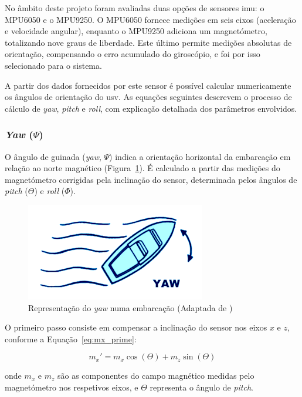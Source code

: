 No âmbito deste projeto foram avaliadas duas opções de sensores \gls{imu}: o MPU6050 e o MPU9250. O MPU6050 fornece medições em seis eixos (aceleração e velocidade angular), enquanto o MPU9250 adiciona um magnetómetro, totalizando nove graus de liberdade. Este último permite medições absolutas de orientação, compensando o erro acumulado do giroscópio, e foi por isso selecionado para o sistema.

A partir dos dados fornecidos por este sensor é possível calcular numericamente os ângulos de orientação do \gls{usv}. As equações seguintes descrevem o processo de cálculo de \emph{yaw}, \emph{pitch} e \emph{roll}, com explicação detalhada dos parâmetros envolvidos.

\subsubsection{\emph{Yaw} (\(\Psi\))}

O ângulo de guinada (\emph{yaw}, \(\Psi\)) indica a orientação horizontal da embarcação em relação ao norte magnético (Figura~\ref{fig:yaw}). É calculado a partir das medições do magnetómetro corrigidas pela inclinação do sensor, determinada pelos ângulos de \emph{pitch} (\(\Theta\)) e \emph{roll} (\(\Phi\)).

\begin{figure}[H]
    \centering
    \includegraphics[height=0.2\linewidth]{figuras/Yaw.png}
    \caption[Representação do \emph{yaw} numa embarcação]{Representação do \emph{yaw} numa embarcação (Adaptada de \cite{imagem-yaw-pitch-roll})}
    \label{fig:yaw}
\end{figure}

O primeiro passo consiste em compensar a inclinação do sensor nos eixos \(x\) e \(z\), conforme a Equação~\ref{eq:mx_prime}:

\begin{equation}
    m_x' = m_x \cos(\Theta) + m_z \sin(\Theta)
    \label{eq:mx_prime}
\end{equation}

onde \(m_x\) e \(m_z\) são as componentes do campo magnético medidas pelo magnetómetro nos respetivos eixos, e \(\Theta\) representa o ângulo de \emph{pitch}.  

